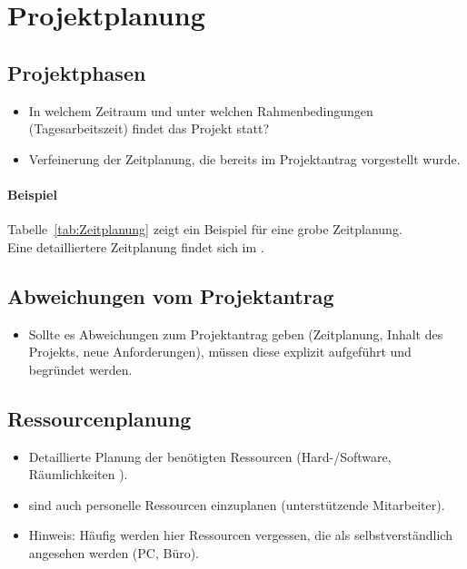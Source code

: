 \section{Projektplanung}
\label{sec:Projektplanung}


\subsection{Projektphasen}
\label{sec:Projektphasen}

\begin{itemize}
	\item In welchem Zeitraum und unter welchen Rahmenbedingungen (\zB Tagesarbeitszeit) findet das Projekt statt?
	\item Verfeinerung der Zeitplanung, die bereits im Projektantrag vorgestellt wurde.
\end{itemize}

\paragraph{Beispiel}
Tabelle~\ref{tab:Zeitplanung} zeigt ein Beispiel für eine grobe Zeitplanung.
\\
Eine detailliertere Zeitplanung findet sich im .


\subsection{Abweichungen vom Projektantrag}
\label{sec:AbweichungenProjektantrag}

\begin{itemize}
	\item Sollte es Abweichungen zum Projektantrag geben (\zB Zeitplanung, Inhalt des Projekts, neue Anforderungen), müssen diese explizit aufgeführt und begründet werden.
\end{itemize}


\subsection{Ressourcenplanung}
\label{sec:Ressourcenplanung}

\begin{itemize}
	\item Detaillierte Planung der benötigten Ressourcen (Hard-/Software, Räumlichkeiten \usw).
	\item \Ggfs sind auch personelle Ressourcen einzuplanen (\zB unterstützende Mitarbeiter).
	\item Hinweis: Häufig werden hier Ressourcen vergessen, die als selbstverständlich angesehen werden (\zB PC, Büro).
\end{itemize}


